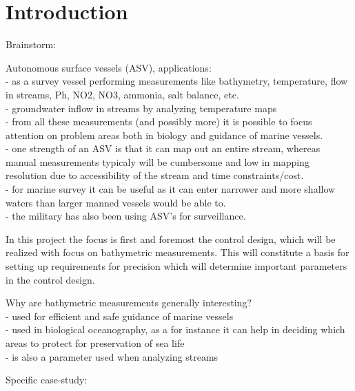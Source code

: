 \chapter{Introduction}

Brainstorm:

Autonomous surface vessels (ASV), applications:\\
- as a survey vessel performing measurements like bathymetry, temperature, flow in streams, Ph, NO2, NO3, ammonia, salt balance, etc.\\
- groundwater inflow in streams by analyzing temperature maps\\
- from all these measurements (and possibly more) it is possible to focus attention on problem areas both in biology and guidance of marine vessels.\\
- one strength of an ASV is that it can map out an entire stream, whereas manual measurements typicaly will be cumbersome and low in mapping resolution due to accessibility of the stream and time constraints/cost.\\
- for marine survey it can be useful as it can enter narrower and more shallow waters than larger manned vessels would be able to.\\
- the military has also been using ASV's for surveillance.

In this project the focus is first and foremost the control design, which will be realized with focus on bathymetric measurements. This will constitute a basis for setting up requirements for precision which will determine important parameters in the control design.

Why are bathymetric measurements generally interesting?\\
- used for efficient and safe guidance of marine vessels \\
- used in biological oceanography, as a for instance it can help in deciding which areas to protect for preservation of sea life \\
- is also a parameter used when analyzing streams 

Specific case-study:
